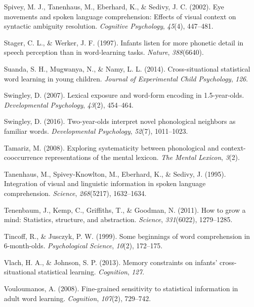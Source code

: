 \documentclass[english,,man,floatsintext]{apa6}
\theoremstyle{definition}
\theoremstyle{definition}
\theoremstyle{definition}
\theoremstyle{remark}
\begin{document}
\hypertarget{ref-spivey2002}{}
Spivey, M. J., Tanenhaus, M., Eberhard, K., \& Sedivy, J. C. (2002). Eye
movements and spoken language comprehension: Effects of visual context
on syntactic ambiguity resolution. \emph{Cognitive Psychology},
\emph{45}(4), 447--481.

\hypertarget{ref-stager1997}{}
Stager, C. L., \& Werker, J. F. (1997). Infants listen for more phonetic
detail in speech perception than in word-learning tasks. \emph{Nature},
\emph{388}(6640).

\hypertarget{ref-suanda2014}{}
Suanda, S. H., Mugwanya, N., \& Namy, L. L. (2014). Cross-situational
statistical word learning in young children. \emph{Journal of
Experimental Child Psychology}, \emph{126}.

\hypertarget{ref-Swingley2007}{}
Swingley, D. (2007). Lexical exposure and word-form encoding in
1.5-year-olds. \emph{Developmental Psychology}, \emph{43}(2), 454--464.

\hypertarget{ref-Swingley2016}{}
Swingley, D. (2016). Two-year-olds interpret novel phonological
neighbors as familiar words. \emph{Developmental Psychology},
\emph{52}(7), 1011--1023.

\hypertarget{ref-Tamariz2008}{}
Tamariz, M. (2008). Exploring systematicity between phonological and
context-cooccurrence representations of the mental lexicon. \emph{The
Mental Lexicon}, \emph{3}(2).

\hypertarget{ref-Tanenhaus1995}{}
Tanenhaus, M., Spivey-Knowlton, M., Eberhard, K., \& Sedivy, J. (1995).
Integration of visual and linguistic information in spoken language
comprehension. \emph{Science}, \emph{268}(5217), 1632--1634.

\hypertarget{ref-tenenbaum11}{}
Tenenbaum, J., Kemp, C., Griffiths, T., \& Goodman, N. (2011). How to
grow a mind: Statistics, structure, and abstraction. \emph{Science},
\emph{331}(6022), 1279--1285.

\hypertarget{ref-tincoff1999}{}
Tincoff, R., \& Jusczyk, P. W. (1999). Some beginnings of word
comprehension in 6-month-olds. \emph{Psychological Science},
\emph{10}(2), 172--175.

\hypertarget{ref-vlach2013}{}
Vlach, H. A., \& Johnson, S. P. (2013). Memory constraints on infants'
cross-situational statistical learning. \emph{Cognition}, \emph{127}.

\hypertarget{ref-vouloumanos2008}{}
Vouloumanos, A. (2008). Fine-grained sensitivity to statistical
information in adult word learning. \emph{Cognition}, \emph{107}(2),
729--742.
\end{document}
